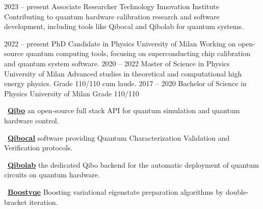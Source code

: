 \documentclass[9pt]{developercv} %
\begin{document}


\begin{entrylist}
	\entry
		{2023 -- present}
		{Associate Researcher}
		{Technology Innovation Institute}
		{Contributing to quantum hardware calibration research and software development, 
        including tools like Qibocal and Qibolab for quantum systems.}
\end{entrylist}



\begin{entrylist}
	\entry
		{2022 -- present}
		{PhD Candidate in Physics}
		{University of Milan}
		{Working on open-source quantum computing tools, focusing on superconducting
        chip calibration and quantum system software.}
	\entry
		{2020 -- 2022}
		{Master of Science in Physics}
		{University of Milan}
        {Advanced studies in theoretical and computational high energy physics.
        Grade 110/110 cum laude.}
	\entry
		{2017 -- 2020}
		{Bachelor of Science in Physics}
		{University of Milan}
		{Grade 110/110}
\end{entrylist}

\begin{entrylist}
	\entry
		{}
        {\faGithub~\href{https://github.com/qiboteam/qibo}{\textbf{Qibo}}}
		{}
        {an open-source full stack API for quantum simulation and quantum hardware control.}

    \entry
        {}
        {\faGithub~\href{https://github.com/qiboteam/qibocal}{\textbf{Qibocal}}}
        {}
        {software providing Quantum Characterization Validation and Verification protocols. }

    \entry
        {}
        {\faGithub~\href{https://github.com/qiboteam/qibolab}{\textbf{Qibolab}}}
        {}
        {the dedicated Qibo backend for the automatic deployment of quantum circuits on quantum hardware. }

    \entry
        {}
        {\faGithub~\href{https://github.com/qiboteam/boostvqe}{\textbf{Boostvqe}}}
        {}
        {Boosting variational eigenstate preparation algorithms by double-bracket iteration.}

\end{entrylist}
\end{document}
